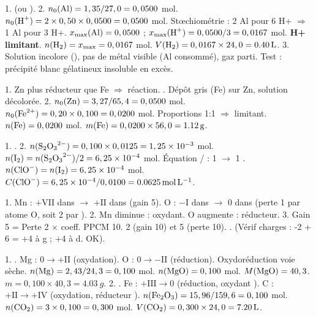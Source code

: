 \documentclass[11pt]{article}
\begin{document}
\begin{corrige}
1.  (ou ).
2. $n_0(\ce{Al}) = 1,35/27,0 = 0,0500$ mol. $n_0(\ce{H+}) = 2 \times 0,50 \times 0,0500 = 0,0500$ mol. Stœchiométrie : 2 Al pour 6 H+ $\Rightarrow$ 1 Al pour 3 H+. $x_{\max}(\ce{Al}) = 0,0500$ ; $x_{\max}(\ce{H+}) = 0,0500/3 = 0,0167$ mol. \textbf{H+ limitant}. $n(\ce{H2}) = x_{\max} = 0,0167$ mol. $V(\ce{H2}) = 0,0167 \times 24,0 = \SI{0,40}{L}$.
3. Solution incolore (), pas de métal visible (Al consommé), gaz  parti. Test  : précipité blanc gélatineux  insoluble en excès.
\end{corrige}

\begin{corrige}
1. Zn plus réducteur que Fe $\Rightarrow$ réaction. . Dépôt gris (Fe) sur Zn, solution décolorée.
2. $n_0(\ce{Zn}) = 3,27/65,4 = 0,0500$ mol. $n_0(\ce{Fe^{2+}}) = 0,20 \times 0,100 = 0,0200$ mol. Proportions 1:1 $\Rightarrow$  limitant. $n(\ce{Fe}) = 0,0200$ mol. $m(\ce{Fe}) = 0,0200 \times 56,0 = \SI{1,12}{g}$.
\end{corrige}

\begin{corrige}
1. .
2. $n(\ce{S2O3^{2-}}) = 0,100 \times 0,0125 = 1,25 \times 10^{-3}$ mol. $n(\ce{I2}) = n(\ce{S2O3^{2-}})/2 = 6,25 \times 10^{-4}$ mol. Équation / : 1  $\to$ 1 . $n(\ce{ClO-}) = n(\ce{I2}) = 6,25 \times 10^{-4}$ mol. $C(\ce{ClO-}) = 6,25 \times 10^{-4} / 0,0100 = \SI{0,0625}{mol.L^{-1}}$.
\end{corrige}

\begin{corrige}
1. Mn : $+\mathrm{VII}$ dans  $\to$ $+\mathrm{II}$ dans  (gain 5). O : $-\mathrm{I}$ dans  $\to$ $0$ dans  (perte 1 par atome O, soit 2 par ).
2. Mn diminue :  oxydant. O augmente :  réducteur.
3. Gain 5 = Perte 2 $\times$ coeff. PPCM 10. 2  (gain 10) et 5  (perte 10).
   . (Vérif charges : -2 + 6 = +4 à g ; +4 à d. OK).
\end{corrige}

\begin{corrige}
1. . Mg : $0 \to +\mathrm{II}$ (oxydation). O : $0 \to -\mathrm{II}$ (réduction). Oxydoréduction voie sèche. $n(\ce{Mg}) = 2,43/24,3 = 0,100$ mol. $n(\ce{MgO}) = 0,100$ mol. $M(\ce{MgO}) = 40,3$. $m = 0,100 \times 40,3 = \SI{4,03}{g}$.
2. . Fe : $+\mathrm{III} \to 0$ (réduction, oxydant ). C : $+\mathrm{II} \to +\mathrm{IV}$ (oxydation, réducteur ). $n(\ce{Fe2O3}) = 15,96/159,6 = 0,100$ mol. $n(\ce{CO2}) = 3 \times 0,100 = 0,300$ mol. $V(\ce{CO2}) = 0,300 \times 24,0 = \SI{7,20}{L}$.
\end{corrige}
\end{document}
